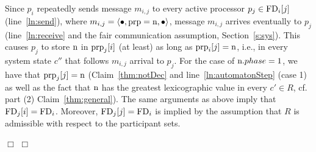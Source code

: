 \documentclass[11pt]{article}
\newcommand{\notif}{prp}
\newenvironment{proof}{\noindent{\bf Proof.}}{\hfill$\Box$}
\begin{document}
\begin{proof}
\begin{proof}
 Since $p_i$ repeatedly sends message $m_{i,j}$ to every active processor $p_j \in \textnormal{FD}_i[j]$ (line~\ref{ln:send}), where $m_{i,j} = \langle \bullet, \textnormal{\notif}=\textnormal{n}, \bullet \rangle$, message $m_{i,j}$ arrives eventually to $p_j$ (line~\ref{ln:receive} and the fair communication assumption, Section~\ref{s:sys}). This causes $p_j$ to store $\textnormal{n}$ in $\textnormal{\notif}_j[i]$ (at least) as long as $\textnormal{\notif}_i[j] = \textnormal{n}$, i.e., in every system state $c''$ that follows $m_{i,j}$ arrival to $p_j$. For the case of $\textnormal{n}.phase=1$, we have that $\textnormal{\notif}_j[j]=\textnormal{n}$ (Claim~\ref{thm:notDec} and line~\ref{ln:automatonStep} (case 1) as well as the fact that $\textnormal{n}$ has the greatest lexicographic value in every $c' \in R$, cf. part (2) Claim~\ref{thm:general}).
The same arguments as above imply that $\textnormal{FD}_j[i] = \textnormal{FD}_i$. Moreover, $\textnormal{FD}_j[j] = \textnormal{FD}_i$ is implied by the assumption that $R$ is admissible with respect to the participant sets.


\end{proof}
\end{proof}
\end{document}
